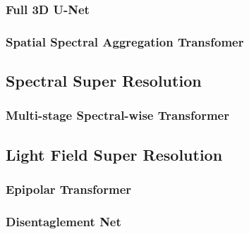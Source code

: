 \subsubsection{Full 3D U-Net}


\subsubsection{Spatial Spectral Aggregation Transfomer}


\subsection{Spectral Super Resolution}

\subsubsection{Multi-stage Spectral-wise Transformer}


\subsection{Light Field Super Resolution}

\subsubsection{Epipolar Transformer}


\subsubsection{Disentaglement Net}
